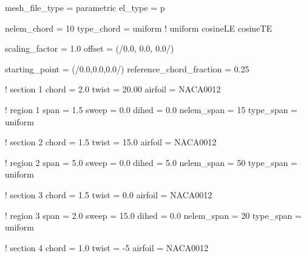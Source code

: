 \begin{inputfile}[frame=single, caption={Parametric geometry for figure \ref{fig:parametric_sections}}, label={file:parametric_example_file.in}]
mesh_file_type = parametric
el_type = p

nelem_chord = 10
type_chord = uniform   ! uniform  cosineLE  cosineTE

scaling_factor = 1.0
offset = (/0.0, 0.0, 0.0/)

starting_point = (/0.0,0.0,0.0/)
reference_chord_fraction = 0.25

! section 1
chord = 2.0
twist = 20.00
airfoil = NACA0012

! region  1
span = 1.5
sweep = 0.0
dihed = 0.0
nelem_span = 15
type_span = uniform

! section 2
chord = 1.5
twist = 15.0
airfoil = NACA0012

! region  2
span = 5.0
sweep = 0.0
dihed = 5.0
nelem_span = 50
type_span = uniform

! section 3
chord = 1.5
twist = 0.0
airfoil = NACA0012

! region  3
span = 2.0
sweep = 15.0
dihed = 0.0
nelem_span = 20
type_span = uniform

! section 4
chord = 1.0
twist = -5
airfoil = NACA0012
\end{inputfile}


